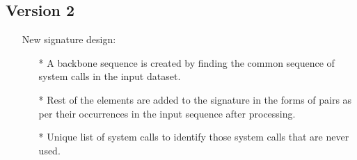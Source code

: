 \subsection{Version 2}
\begin{itemize}
    \item[] {New signature design:}
        \begin{itemize}
            \item[*] A backbone sequence is created by finding the common sequence of system calls in the input dataset.
            \item[*] Rest of the elements are added to the signature in the forms of pairs as per their occurrences in the input sequence after processing.
            \item[*] Unique list of system calls to identify those system calls that are never used.
        \end{itemize}
\end{itemize}

